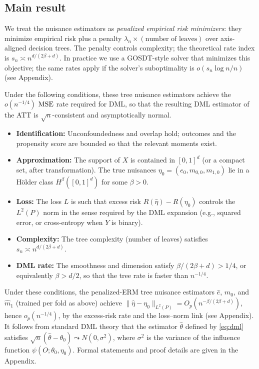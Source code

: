 \documentclass[12pt]{article}
\begin{document}
\subsection{Main result}

We treat the nuisance estimators as \emph{penalized empirical risk minimizers}: they minimize empirical risk plus a penalty $\lambda_n \times (\text{number of leaves})$ over axis-aligned decision trees. The penalty controls complexity; the theoretical rate index is $s_n \asymp n^{d/(2\beta+d)}$. In practice we use a GOSDT-style solver that minimizes this objective; the same rates apply if the solver's suboptimality is $o(s_n \log n / n)$ (see Appendix).

Under the following conditions, these tree nuisance estimators achieve the $o(n^{-1/4})$ $\operatorname{MSE}$ rate required for DML, so that the resulting DML estimator of the ATT is $\sqrt{n}$-consistent and asymptotically normal.

\begin{itemize}
\item \textbf{Identification:} Unconfoundedness and overlap hold; outcomes and the propensity score are bounded so that the relevant moments exist.
\item \textbf{Approximation:} The support of $X$ is contained in $[0,1]^d$ (or a compact set, after transformation). The true nuisances $\eta_0 = (e_0, m_{0,0}, m_{1,0})$ lie in a H\"older class $H^\beta([0,1]^d)$ for some $\beta > 0$.
\item \textbf{Loss:} The loss $L$ is such that excess risk $R(\hat\eta) - R(\eta_0)$ controls the $L^2(P)$ norm in the sense required by the DML expansion (e.g., squared error, or cross-entropy when $Y$ is binary).
\item \textbf{Complexity:} The tree complexity (number of leaves) satisfies $s_n \asymp n^{d/(2\beta+d)}$.
\item \textbf{DML rate:} The smoothness and dimension satisfy $\beta/(2\beta+d) > 1/4$, or equivalently $\beta > d/2$, so that the tree rate is faster than $n^{-1/4}$.
\end{itemize}
Under these conditions, the penalized-ERM tree nuisance estimators $\hat{e}$, $\hat{m}_0$, and $\hat{m}_1$ (trained per fold as above) achieve $\|\hat\eta - \eta_0\|_{L^2(P)} = O_p(n^{-\beta/(2\beta+d)})$, hence $o_p(n^{-1/4})$, by the excess-risk rate and the loss--norm link (see Appendix). It follows from standard DML theory \citep{chernozhukov2018} that the estimator $\hat\theta$ defined by \eqref{eq:dml} satisfies $\sqrt{n}(\hat\theta - \theta_0) \leadsto N(0, \sigma^2)$, where $\sigma^2$ is the variance of the influence function $\psi(O; \theta_0, \eta_0)$. Formal statements and proof details are given in the Appendix.
\end{document}
